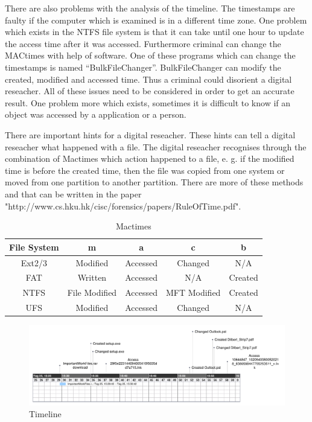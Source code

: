 There are also problems with the analysis of the timeline. The timestamps are faulty if the computer which is examined is in a different time zone. One problem which exists in the NTFS file system is that it can take until one hour to update the access time after it was accessed. Furthermore criminal can change the MACtimes with help of software. One of these programs which can change the timestamps is named “BulkFileChanger”. BulkFileChanger can modify the created, modified and accessed time. Thus a criminal could disorient a digital reseacher. All of these issues need to be considered in order to get an accurate result. One problem more which exists, sometimes it is difficult to know if an object was accessed by a application or a person. 

There are important hints for a digital reseacher. These hints can tell a digital reseacher what happened with a file. The digital reseacher recognises through the combination of Mactimes which action happened to a file, e. g. if the modified time is before the created time, then the file was copied from one system or moved from one partition to another partition. There are more of these methods and that can be written in the paper "http://www.cs.hku.hk/cisc/forensics/papers/RuleOfTime.pdf".






\begin{table}[h]
\begin{tabular}{c|c|c|c|c}
	File System & m & a & c & b \\
	\hline \hline
	Ext2/3 & Modified & Accessed & Changed & N/A \\
	\hline
	FAT & Written & Accessed & N/A & Created \\
	\hline
	NTFS & File Modified & Accessed & MFT Modified & Created \\
	\hline
	UFS & Modified & Accessed & Changed & N/A \\

\end{tabular}
\caption{Mactimes}
\label{fig:Mactimes}
\end{table}


\begin{figure}[tbph]
	\centering
		\includegraphics[width=18cm]{graphics/Timeline.pdf} 	
	\caption{Timeline}
	\label{fig:timeline}
\end{figure}




